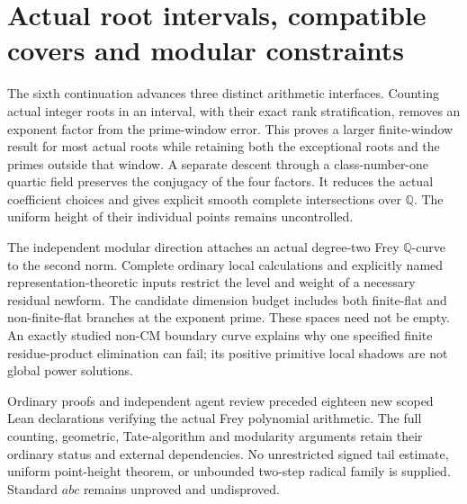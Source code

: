 \section{Actual root intervals, compatible covers and modular constraints}
\label{sec:quartic-modular-checkpoint}

The sixth continuation advances three distinct arithmetic interfaces.
Counting actual integer roots in an interval, with their exact rank
stratification, removes an exponent factor from the prime-window error.
This proves a larger finite-window result for most actual roots while
retaining both the exceptional roots and the primes outside that window.
A separate descent through a class-number-one quartic field preserves
the conjugacy of the four factors. It reduces the actual coefficient
choices and gives explicit smooth complete intersections over $\mathbb Q$.
The uniform height of their individual points remains uncontrolled.

The independent modular direction attaches an actual degree-two Frey
$\mathbb Q$-curve to the second norm. Complete ordinary local calculations
and explicitly named representation-theoretic inputs restrict the level
and weight of a necessary residual newform. The candidate dimension budget
includes both finite-flat and non-finite-flat branches at the exponent
prime. These spaces need not be empty. An exactly studied non-CM boundary
curve explains why one specified finite residue-product elimination can
fail; its positive primitive local shadows are not global power solutions.

Ordinary proofs and independent agent review preceded eighteen new scoped
Lean declarations verifying the actual Frey polynomial arithmetic. The
full counting, geometric, Tate-algorithm and modularity arguments retain
their ordinary status and external dependencies. No unrestricted signed
tail estimate, uniform point-height theorem, or unbounded two-step radical
family is supplied. Standard $abc$ remains unproved and undisproved.
